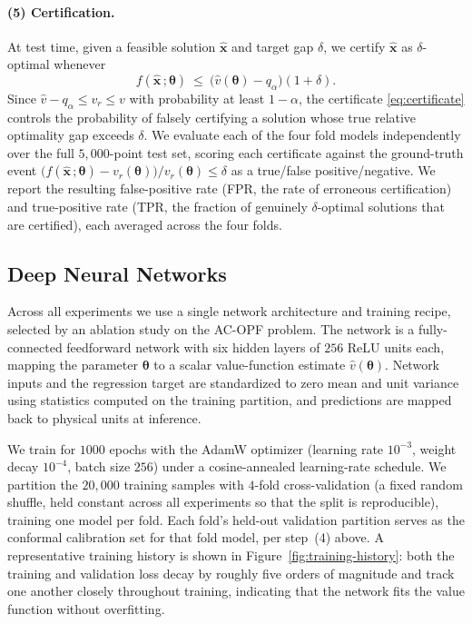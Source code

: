 \documentclass[10pt]{article} %
\theoremstyle{plain}
\theoremstyle{definition}
\theoremstyle{remark}
\begin{document}
\paragraph{(5) Certification.} At test time, given a feasible solution $\hat{\mathbf{x}}$ and target gap $\delta$, we certify $\hat{\mathbf{x}}$ as $\delta$-optimal whenever
\begin{equation}
    f(\hat{\mathbf{x}}\,;\bm{\theta}) ~\leq~ \big(\hat{v}(\bm{\theta}) - q_\alpha\big)(1 + \delta).
    \label{eq:certificate}
\end{equation}
Since $\hat{v} - q_\alpha \leq v_r \leq v$ with probability at least $1 - \alpha$, the certificate \eqref{eq:certificate} controls the probability of falsely certifying a solution whose true relative optimality gap exceeds $\delta$. We evaluate each of the four fold models independently over the full $5{,}000$-point test set, scoring each certificate against the ground-truth event $\big(f(\hat{\mathbf{x}}\,;\bm{\theta}) - v_r(\bm{\theta})\big) / v_r(\bm{\theta}) \leq \delta$ as a true/false positive/negative. We report the resulting false-positive rate (FPR, the rate of erroneous certification) and true-positive rate (TPR, the fraction of genuinely $\delta$-optimal solutions that are certified), each averaged across the four folds.

\subsection*{Deep Neural Networks} \label{subsec:dnn}

Across all experiments we use a single network architecture and training recipe, selected by an ablation study on the AC-OPF problem. The network is a fully-connected feedforward network with six hidden layers of $256$ ReLU units each, mapping the parameter $\bm{\theta}$ to a scalar value-function estimate $\hat{v}(\bm{\theta})$. Network inputs and the regression target are standardized to zero mean and unit variance using statistics computed on the training partition, and predictions are mapped back to physical units at inference.

We train for $1000$ epochs with the AdamW optimizer (learning rate $10^{-3}$, weight decay $10^{-4}$, batch size $256$) under a cosine-annealed learning-rate schedule. We partition the $20{,}000$ training samples with $4$-fold cross-validation (a fixed random shuffle, held constant across all experiments so that the split is reproducible), training one model per fold. Each fold's held-out validation partition serves as the conformal calibration set for that fold model, per step~(4) above. A representative training history is shown in Figure~\ref{fig:training-history}: both the training and validation loss decay by roughly five orders of magnitude and track one another closely throughout training, indicating that the network fits the value function without overfitting.
\end{document}
